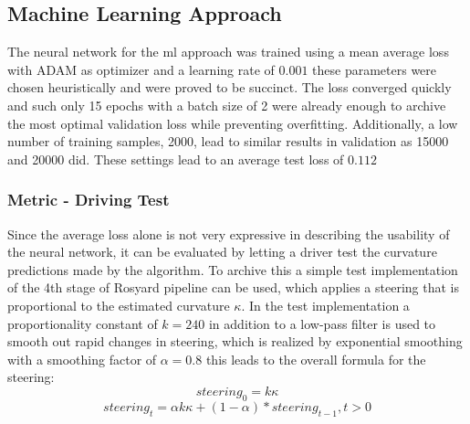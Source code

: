 
\subsection{Machine Learning Approach}
The neural network for the \ac{ml} approach was trained using a mean average loss with ADAM as optimizer and a learning rate of $0.001$ these parameters were chosen heuristically and were proved to be succinct. The loss converged quickly and such only 15 epochs with a batch size of 2 were already enough to archive the most optimal validation loss while preventing overfitting. Additionally, a low number of training samples, 2000, lead to similar results in validation as 15000 and 20000 did. These settings lead to an average test loss of $0.112$

\subsubsection{Metric - Driving Test}
Since the average loss alone is not very expressive in describing the usability of the neural network, it can be evaluated by letting a driver test the curvature predictions made by the algorithm. To archive this a simple test implementation of the 4th stage of Rosyard pipeline can be used, which applies a steering that is proportional to the estimated curvature $\kappa$. In the test implementation a proportionality constant of $k = 240$ in addition to a low-pass filter is used to smooth out rapid changes in steering, which is realized by exponential smoothing with a smoothing factor of $\alpha = 0.8$ this leads to the overall formula for the steering:
$$steering_0= k\kappa$$
$$steering_t= \alpha k\kappa + (1-\alpha)*steering_{t-1}, t > 0$$ 


